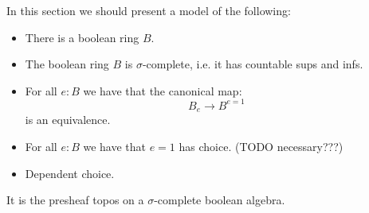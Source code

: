 In this section we should present a model of the following:

\begin{itemize}
\item There is a boolean ring $B$.
\item The boolean ring $B$ is $\sigma$-complete, i.e. it has countable sups and infs.
\item For all $e:B$ we have that the canonical map:
\[B_e \to B^{e=1}\]
is an equivalence.
\item For all $e:B$ we have that $e=1$ has choice. (TODO necessary???)
\item Dependent choice.
\end{itemize}

It is the presheaf topos on a $\sigma$-complete boolean algebra.

